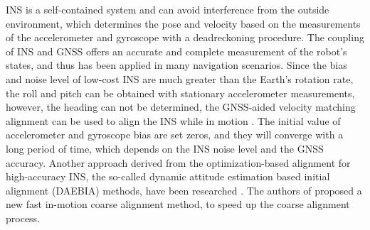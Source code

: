 \documentclass[journal,article,submit,moreauthors,pdftex]{Definitions/mdpi}
\begin{document}
INS is a self-contained system and can avoid interference from the outside environment, which determines the pose and velocity based on the measurements of the accelerometer and gyroscope with a deadreckoning procedure\cite{huangNewFastInMotion2018}. The coupling of INS and GNSS offers an accurate and complete measurement of the robot’s states, and thus has been applied in many navigation scenarios\cite{zhongAdaptiveInFlightAlignment2018}. Since the bias and noise level of low-cost INS are much greater than the Earth’s rotation rate, the roll and pitch can be obtained with stationary accelerometer measurements, however, the heading can not be determined, the GNSS-aided velocity matching alignment can be used to align the INS while in
motion \cite{shinAccuracyImprovementLow}. The initial value of  accelerometer and gyroscope bias are set zeros, and they will converge with a long period of time, which depends on the INS noise level and the GNSS accuracy. Another approach derived from the optimization-based alignment for high-accuracy INS, the so-called dynamic attitude estimation based initial alignment (DAEBIA) methods, have been researched \cite{wuVelocityPositionIntegration2013b,changOptimizationbasedAlignmentStrapdown2016}. The authors of \cite{huangNewFastInMotion2018} proposed a new fast in-motion coarse alignment method, to speed up the coarse alignment process. 
\end{document}

